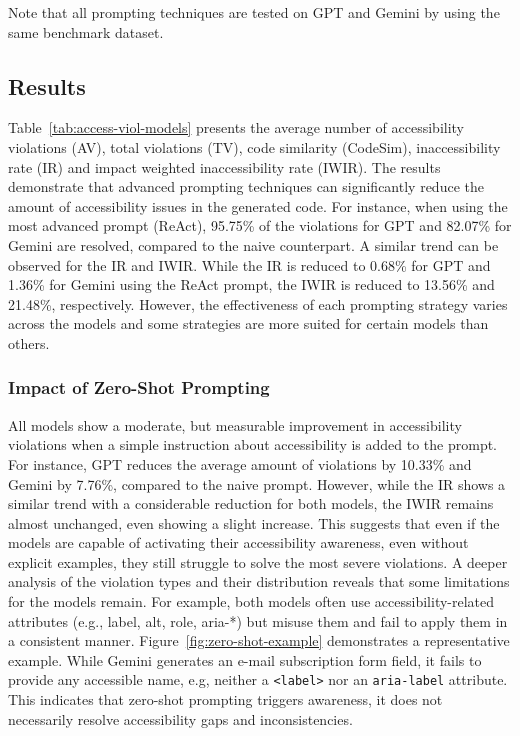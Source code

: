 Note that all prompting techniques are tested on GPT and Gemini by using the 
same benchmark dataset.


\subsection{Results}
Table~\ref{tab:access-viol-models} presents the average number of accessibility 
violations (AV), total violations (TV), code similarity (CodeSim),
inaccessibility rate (IR) and impact weighted inaccessibility rate (IWIR).
The results demonstrate that advanced prompting techniques can significantly
reduce the amount of accessibility issues in the generated code. For instance,
when using the most advanced prompt (ReAct), 95.75\% of the violations for 
GPT and 82.07\% for Gemini are resolved, compared to the naive counterpart.
A similar trend can be observed for the IR and IWIR. While the 
IR is reduced to 0.68\% for GPT and 1.36\% for Gemini using the ReAct 
prompt, the IWIR is reduced to 13.56\% and 21.48\%, respectively. However, 
the effectiveness of each prompting strategy varies across the models and 
some strategies are more suited for certain models than others.


\begingroup
    
\endgroup

\subsubsection{Impact of Zero-Shot Prompting}
All models show a moderate, but measurable improvement in accessibility 
violations when a simple instruction about accessibility is added to 
the prompt. For instance, GPT reduces the average amount of 
violations by 10.33\% and Gemini by 7.76\%, compared to the 
naive prompt. However, while the IR shows a similar trend with 
a considerable reduction for both models, the IWIR remains almost 
unchanged, even showing a slight increase. This suggests that even 
if the models are capable of activating their accessibility 
awareness, even without explicit examples, they still struggle to 
solve the most severe violations.\newline
A deeper analysis of the violation types and their distribution 
reveals that some limitations for the models remain. For example,
both models often use accessibility-related attributes (e.g., 
label, alt, role, aria-*) but misuse them and fail to apply them 
in a consistent manner. Figure~\ref{fig:zero-shot-example} demonstrates
a representative example. While Gemini generates an e-mail 
subscription form field, it fails to provide any accessible name,
e.g, neither a \texttt{<label>} nor an \texttt{aria-label} attribute.
This indicates that zero-shot prompting triggers awareness, it 
does not necessarily resolve accessibility gaps and inconsistencies.


